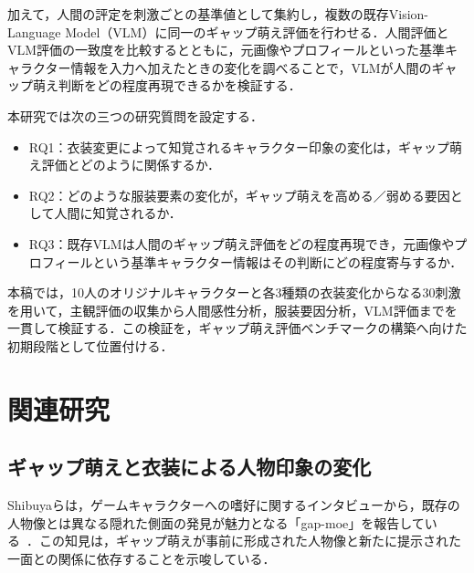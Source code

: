 \documentclass[a4j,twocolumn,11pt]{jarticle}
\begin{document}

加えて，人間の評定を刺激ごとの基準値として集約し，複数の既存Vision-Language Model（VLM）に同一のギャップ萌え評価を行わせる．人間評価とVLM評価の一致度を比較するとともに，元画像やプロフィールといった基準キャラクター情報を入力へ加えたときの変化を調べることで，VLMが人間のギャップ萌え判断をどの程度再現できるかを検証する．



本研究では次の三つの研究質問を設定する．
\begin{itemize}
 \item RQ1：衣装変更によって知覚されるキャラクター印象の変化は，ギャップ萌え評価とどのように関係するか．
 \item RQ2：どのような服装要素の変化が，ギャップ萌えを高める／弱める要因として人間に知覚されるか．
 \item RQ3：既存VLMは人間のギャップ萌え評価をどの程度再現でき，元画像やプロフィールという基準キャラクター情報はその判断にどの程度寄与するか．
\end{itemize}
本稿では，10人のオリジナルキャラクターと各3種類の衣装変化からなる30刺激を用いて，主観評価の収集から人間感性分析，服装要因分析，VLM評価までを一貫して検証する．この検証を，ギャップ萌え評価ベンチマークの構築へ向けた初期段階として位置付ける．



\section{関連研究}
\subsection{ギャップ萌えと衣装による人物印象の変化}
Shibuyaらは，ゲームキャラクターへの嗜好に関するインタビューから，既存の人物像とは異なる隠れた側面の発見が魅力となる「gap-moe」を報告している~\cite{1}．この知見は，ギャップ萌えが事前に形成された人物像と新たに提示された一面との関係に依存することを示唆している．
\end{document}

